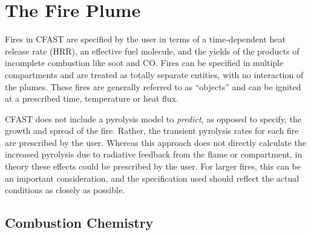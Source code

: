 \documentclass[12pt]{book}
\begin{document}
\chapter{The Fire Plume}
\label{sec:TheFire}

Fires in CFAST are specified by the user in terms of a time-dependent heat release rate (HRR), an effective fuel molecule, and the yields of the products of incomplete combustion like soot and CO. Fires can be specified in multiple compartments and are treated as totally separate entities, with no interaction of the plumes. These fires are generally referred to as ``objects'' and can be ignited at a prescribed time, temperature or heat flux.

CFAST does not include a pyrolysis model to {\em predict}, as opposed to specify, the growth and spread of the fire. Rather, the transient pyrolysis rates for each fire are prescribed by the user. Whereas this approach does not directly calculate the increased pyrolysis due to radiative feedback from the flame or compartment, in theory these effects could be prescribed by the user. For larger fires, this can be an important consideration, and the specification used should reflect the actual conditions as closely as possible.

\section{Combustion Chemistry}
\end{document}
